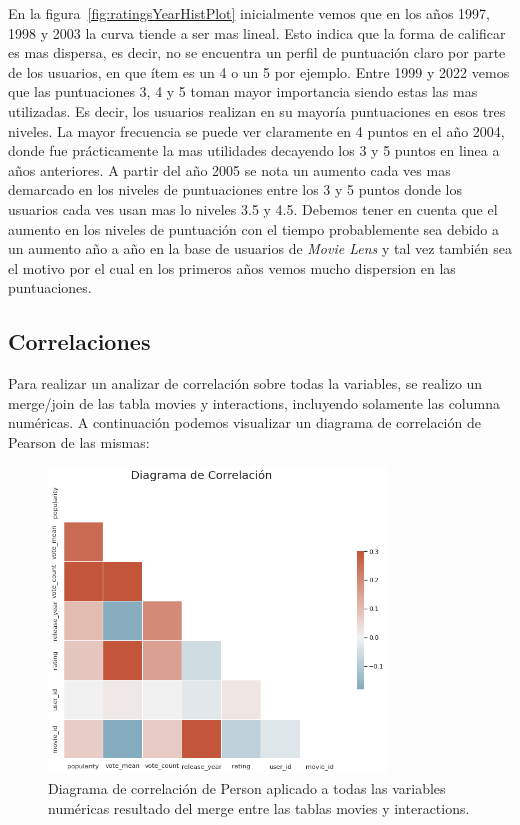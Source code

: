 \documentclass[11pt,a4paper,twoside]{thesis}
\begin{document}
En la figura~\ref{fig:ratingsYearHistPlot} inicialmente vemos que en los años
1997, 1998 y 2003 la curva tiende a ser mas lineal. Esto indica que la forma de
calificar es mas dispersa, es decir, no se encuentra un perfil de puntuación
claro por parte de los usuarios, en que ítem es un 4 o un 5 por ejemplo. Entre
1999 y 2022 vemos que las puntuaciones 3, 4 y 5 toman mayor importancia siendo
estas las mas utilizadas. Es decir, los usuarios realizan en su mayoría
puntuaciones en esos tres niveles. La mayor frecuencia se puede ver claramente
en 4 puntos en el año 2004, donde fue prácticamente la mas utilidades decayendo
los 3 y 5 puntos en linea a años anteriores. A partir del año 2005 se nota un
aumento cada ves mas demarcado en los niveles de puntuaciones entre los 3 y 5
puntos donde los usuarios cada ves usan mas lo niveles 3.5 y 4.5. Debemos tener
en cuenta que el aumento en los niveles de puntuación con el tiempo
probablemente sea debido a un aumento año a año en la base de usuarios de
\textit{Movie Lens} y tal vez también sea el motivo por el cual en los primeros
años vemos mucho dispersion en las puntuaciones.

\clearpage

\subsection{Correlaciones}

Para realizar un analizar de correlación sobre todas la variables, se realizo
un merge/join de las tabla movies y interactions, incluyendo solamente las
columna numéricas. A continuación podemos visualizar un diagrama de correlación
de Pearson de las mismas:

\begin{figure}[h!]
	\centering
	\includegraphics[width=9cm]{./images/Correlations.png}
	\caption{Diagrama de correlación de Person aplicado a todas las variables numéricas resultado del merge entre las tablas movies y interactions.}
	\label{fig:correlationPlot}
\end{figure}
\end{document}
